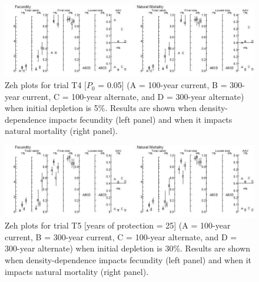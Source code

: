 \documentclass{article}\usepackage[]{graphicx}\usepackage[]{color}
\providecommand\phantomsection{}
\renewcommand{\thefigure}{\thesection(\alph{figure})}
\begin{document}
\begin{landscape}
\phantomsection
\renewcommand{\thefigure}{\thesection}
\setcounter{figure}{0}


\begin{figure}[H]
\centering
\includegraphics[]{SC66aRMP10_Part2_T4-R.jpeg}
\caption{
Zeh plots for trial T4
[$P_0 $ = 0.05]
(A = 100-year current, B = 300-year current, C = 100-year alternate, and D = 300-year alternate)
when initial depletion is 5\%.
Results are shown when density-dependence impacts fecundity (left panel) and when it impacts natural mortality (right panel).
}
\end{figure}

\phantomsection
{}
\setcounter{figure}{0}


\begin{figure}[H]
\centering
\includegraphics[]{SC66aRMP10_Part2_T5-R.jpeg}
\caption{
Zeh plots for trial T5
[years of protection = 25]
(A = 100-year current, B = 300-year current, C = 100-year alternate, and D = 300-year alternate)
when initial depletion is 30\%.
Results are shown when density-dependence impacts fecundity (left panel) and when it impacts natural mortality (right panel).
}
\end{figure}


\end{landscape}
\end{document}
